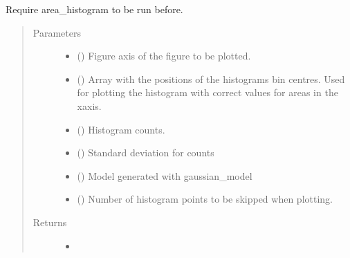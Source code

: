 \documentclass[letterpaper,10pt,english]{sphinxmanual}
\begin{document}
\begin{fulllineitems}
\label{\detokenize{tes:tes.calibration.plot_area}}
\sphinxAtStartPar
Require area\_histogram to be run before.
\begin{quote}\begin{description}
\item[{Parameters}] \leavevmode\begin{itemize}
\item {} 
\sphinxAtStartPar
{} () \textendash{} Figure axis of the figure to be plotted.

\item {} 
\sphinxAtStartPar
{} () \textendash{} Array with the positions of the histograms bin centres.
Used for plotting the histogram with correct values
for areas in the x\sphinxhyphen{}axis.

\item {} 
\sphinxAtStartPar
{} () \textendash{} Histogram counts.

\item {} 
\sphinxAtStartPar
{} () \textendash{} Standard deviation for counts

\item {} 
\sphinxAtStartPar
{} () \textendash{} Model generated with gaussian\_model

\item {} 
\sphinxAtStartPar
{} () \textendash{} Number of histogram points to be skipped when plotting.

\end{itemize}

\item[{Returns}] \leavevmode
\sphinxAtStartPar
\begin{itemize}
\item {} 
\sphinxAtStartPar
{}


\end{itemize}
\end{description}
\end{quote}
\end{fulllineitems}
\end{document}
